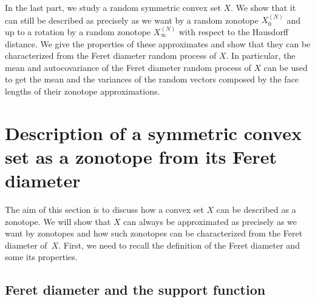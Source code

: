 \documentclass[numbers,compress,v1.0.1]{vmsta}
\theoremstyle{definition}
\begin{document}
In the last part, we study a random symmetric convex set $X$. We show
that it can still be described as precisely as we want by a random
zonotope $X^{(N)}_0$ and up to a rotation by a random zonotope
$X^{(N)}_\infty$ with respect to the Hausdorff distance. We give the
properties of these approximates and show that they can be
characterized from the Feret diameter random process of $X$. In
particular, the mean and autocovariance of the Feret diameter random
process of $X$ can be used to get the mean and the variances of the
random vectors composed by the face lengths of their zonotope approximations.

\section{Description of a symmetric convex set as a zonotope from its
Feret diameter}

The aim of this section is to discuss how a convex set $X$ can be
described as a zonotope. We will show that $X$ can always be
approximated as precisely as we want by zonotopes and how such
zonotopes can be characterized from the Feret diameter of~$X$. First,
we need to recall the definition of the Feret diameter and some its properties.

\subsection{Feret diameter and the support function}

\smallskip
\end{document}
